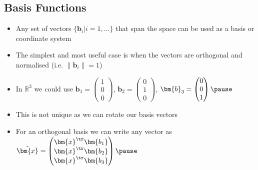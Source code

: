 
\begin{slide}
\section[-2]{Basis Functions}

\begin{PauseHighLight}
  \begin{itemize}
  \item Any set of vectors $\{\bm{b}_i|i=1,\ldots\}$ that span the space
    can be used as a basis or coordinate system\pause
  \item The simplest and most useful case is when the vectors are
    orthogonal and normalised (i.e. $\|\bm{b}_i\|=1$)\pause
  \item In $\mathbb{R}^3$ we could use $\bm{b}_1 =
    \begin{pmatrix}
      1 \\ 0 \\ 0
    \end{pmatrix}$, $\bm{b}_2 =
    \begin{pmatrix}
      0 \\ 1 \\ 0
    \end{pmatrix}$, $\bm{b}_3 =
    \begin{pmatrix}
      0 \\ 0 \\ 1
    \end{pmatrix}\pause$
  \item This is not unique as we can rotate our basis vectors\pause
  \item For an orthogonal basis we can write any vector as $\hat{\bm{x}} =
    \begin{pmatrix}
      \bm{x}^\tr\bm{b_1} \\ \bm{x}^\tr\bm{b_2} \\ \bm{x}^\tr\bm{b_3}
    \end{pmatrix}\pause$
  \end{itemize}
\end{PauseHighLight}

\end{slide}


